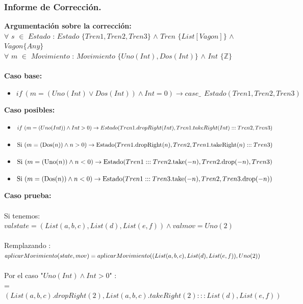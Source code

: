 \documentclass[12pt, a4paper]{article}
\begin{document}
\subsubsection{Informe de Corrección.}
\textbf{Argumentación sobre la corrección:} \\
$\forall$ $s$ $\in$ $Estado$ : $Estado$ $\{Tren1,Tren2,Tren3\}$ $\wedge$  $Tren$ $\{List[Vagon]\}$ $\wedge$ $Vagon\{Any\}$\\
$\forall$ $m$ $\in$ $Movimiento$ : $Movimiento$ $\{Uno(Int),Dos(Int)\}$ $\wedge$ $Int$ $\{\mathbb{Z}\}$\\
\\ \textbf{Caso base:}
\begin{itemize}
  \item $if~(m = (Uno(Int) \vee Dos(Int)) \wedge Int = 0 )\rightarrow case \_ ~~Estado(Tren1,Tren2,Tren3)$
\end{itemize}
 \textbf{Caso posibles:}
\begin{itemize}
  \item $if~(m = (Uno(Int)) \wedge Int > 0 )\rightarrow \\ Estado(Tren1.dropRight(Int),Tren1.takeRight(Int):::Tren2,Tren3)$
  \item $ \text{Si}~(m = (\text{Dos}(n)) \wedge n > 0 ) \rightarrow \\ \text{Estado}(Tren1.\text{dropRight}(n), Tren2, Tren1.\text{takeRight}(n):::Tren3)$
  \item $\text{Si}~(m = (\text{Uno}(n)) \wedge n < 0 ) \rightarrow \\ \text{Estado}(Tren1:::Tren2.\text{take}(-n), Tren2.\text{drop}(-n), Tren3)$ 
  \item $\text{Si}~(m = (\text{Dos}(n)) \wedge n < 0 ) \rightarrow \\ \text{Estado}(Tren1:::Tren3.\text{take}(-n), Tren2, Tren3.\text{drop}(-n))$ 
\end{itemize}
\textbf{Caso prueba:} \\ \\
Si tenemos: \\ $val state = (List(a, b, c), List(d), List(e, f)) \wedge val mov = Uno(2)$
\\ \\ Remplazando : \\ $aplicarMovimiento(state, mov)= \\ aplicarMovimiento((List(a, b, c), List(d), List(e, f)), Uno(2))$ \\ \\
Por el caso "$Uno(Int) \wedge Int > 0$" : \\ = $(List(a, b, c).dropRight(2),  List(a, b, c).takeRight(2) ::: List(d), List(e, f))$
\end{document}
